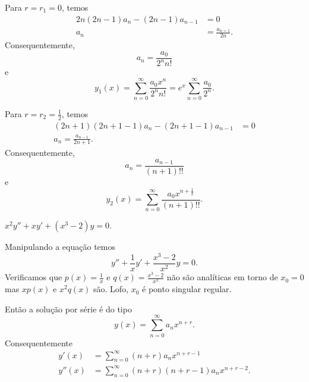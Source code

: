 \documentclass[a4paper,12pt, leqno, answers]{exam}
\begin{document}
\begin{questions}
\begin{solution}
        Para $r = r_1 = 0$, temos
        \begin{align*}
            2 n \left(2 n - 1 \right) a_n - \left( 2 n - 1 \right) a_{n - 1} &= 0 \\
            a_n &= \frac{a_{n = 1}}{2 n}.
        \end{align*}
        Consequentemente,
        \[
        a_n = \frac{a_0}{2^n n!}
        \]
        e
        \[
        y_1(x) = \sum_{n = 0}^\infty \frac{a_0 x^n}{2^n n!} = e^x \sum_{n = 0}^\infty \frac{a_0}{2^n}.
        \]


        Para $r = r_2 = \frac{1}{2}$, temos
        \begin{align*}
            \left( 2 n + 1 \right) \left( 2 n + 1 - 1 \right) a_n - \left( 2 n + 1 - 1 \right) a_{n - 1} &= 0 \\
            a_n = \frac{a_{n - 1}}{2 n + 1}.
        \end{align*}
        Consequentemente,
        \[
        a_n = \frac{a_{n - 1}}{\left( n + 1 \right)!!}
        \]
        e
        \[
        y_2(x) = \sum_{n = 0}^\infty \frac{a_0 x^{n + \frac{1}{2}}}{\left( n + 1 \right)!!}.
        \]
    \end{solution}

    \question $x^2 y'' + x y' + \left( x^3 - 2 \right) y = 0$.
    \begin{solution}
        Manipulando a equa\c{c}\~{a}o temos
        \[
        y'' + \frac{1}{x} y' + \frac{x^3 - 2}{x^2} y = 0.
        \]
        Verificamos que $p(x) = \frac{1}{x}$ e $q(x) = \frac{x^3 - 2}{x^2}$ n\~{a}o s\~{a}o anal\'{i}ticas em torno de $x_0 = 0$ mas $x p(x)$ e $x^2 q(x)$ s\~{a}o. Lofo, $x_0$ \'{e} ponto singular regular.

        Ent\~{a}o a solu\c{c}\~{a}o por s\'{e}rie \'{e} do tipo
        \[
        y\left( x \right) = \sum_{n = 0}^\infty a_n x^{n + r}.
        \]
        Consequentemente
        \begin{align*}
            y'(x) &= \sum_{n = 0}^\infty \left( n + r \right) a_n x^{n + r - 1} \\
            y''(x) &= \sum_{n = 0}^\infty \left( n + r \right) \left( n + r - 1 \right) a_n x^{n + r - 2}.
        \end{align*}


\end{solution}
\end{questions}
\end{document}
